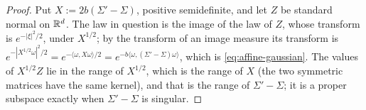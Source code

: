 \begin{proof}
\leanok
Put $X := 2b(\Sigma' - \Sigma)$, positive semidefinite, and let $Z$ be standard normal on $\mathbb{R}^d$.
The law in question is the image of the law of $Z$, whose transform is $e^{-|\xi|^2/2}$, under
$X^{1/2}$; by the transform of an image measure its transform is
$e^{-|X^{1/2}\omega|^2/2} = e^{-\langle\omega,X\omega\rangle/2}
= e^{-b\langle\omega,(\Sigma'-\Sigma)\omega\rangle}$, which is \ref{eq:affine-gaussian}. The values of $X^{1/2}Z$ lie in the range of $X^{1/2}$, which is the
range of $X$ (the two symmetric matrices have the same kernel), and that is the range of
$\Sigma' - \Sigma$; it is a proper subspace exactly when $\Sigma' - \Sigma$ is singular.
\end{proof}

